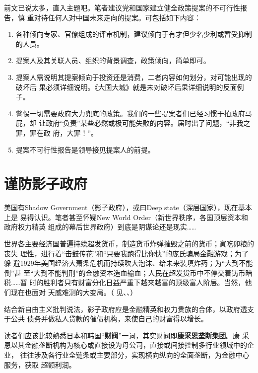 前文已说太多，直入主题吧。笔者建议党和国家建立健全政策提案的不可行性报告，慎
重对待任何人对中国未来走向的提案。可包括如下内容：
\begin{enumerate}
\item 各种倾向专家、官僚组成的评审机制，建议倾向于有才但少名少利或暂受抑制的人员。

\item 提案人及其关联人员、组织的背景调查，政策倾向，简单即可。

\item 提案人需说明其提案倾向于投资还是消费，二者内容如何划分，对可能出现的破坏后
  果必须详细说明。《大国大城》就是未对破坏后果详细说明的反面例子。

\item 警惕一切需要政府大力兜底的政策。我们的一些提案者们已经习惯于拍政府马屁，却
  让政府“负责”某些必然或极可能失败的内容。届时出了问题，“非我之罪，罪在政
  府，大罪！”。

\item 提案不可行性报告是领导接见提案人的前提。
\end{enumerate}

\section{谨防影子政府}

美国有Shadow Government（影子政府），或曰Deep state（深层国家），现在基本上是
易得认识。笔者甚至怀疑New World Order（新世界秩序，各国顶层资本和政府权力精英
组成的幕后世界政府）到底是阴谋论还是现实……

世界各主要经济国普遍持续超发货币，制造货币炸弹摧毁之前的货币；寅吃卯粮的丧失
理性，进行着“击鼓传花”和“只要我跑得比你快”的庞氏骗局金融游戏；为了躲
避1929年美国经济大萧条危机而持续吹大泡沫、给未来装填炸药；为“大到不能倒”甚
至“大到不能判刑”的金融资本造血输血；人民在超发货币中不停交着铸币暗税……暂
时的胜利者只有财富分化日益严重下越来越富的顶级富人阶层。当然，他们现在也面对
天威难测的大变局。（
见\cite{piepenburg2022gold}、\cite{streeck2017will}、）

结合新自由主义批判说法，影子政府应是金融精英和权力贵族的合体，以政府透支于公共
债务并做私人贷款的催债机构，来使自己的财富得以增长。

读者们应该比较熟悉日本和韩国“\textbf{财阀}”一词，其实财阀即\textbf{康采恩垄断集团}。康
采恩以其金融垄断机构为核心或直接设为母公司，直接或间接控制多行业领域中的企业，
往往涉及各行业全链条或主要部分，实现横向纵向的全面垄断，为金融中心服务，获取
超额利润。

